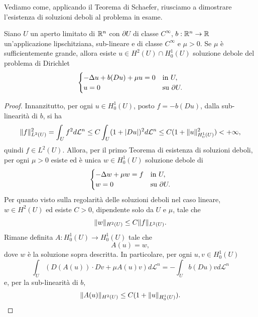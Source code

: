 Vediamo come, applicando il Teorema di Schaefer, riusciamo a dimostrare l'esistenza di soluzioni deboli al problema in esame.
\begin{teorema}
	Siano $U$ un aperto limitato di $\mathbb{R}^n$ con $\partial U$ di classe $C^\infty$, $b: \mathbb{R}^n \to \mathbb{R}$ un'applicazione lipschitziana, sub-lineare e di classe $C^\infty$ e $\mu >0$. Se $\mu$ è sufficientemente grande, allora esiste $u \in H^2(U)\cap H^1_0(U)$ soluzione debole
	del problema di Dirichlet
	\[ 	\begin{cases}
		-\Delta u + b(Du) + \mu u = 0 & \textup{in } U,\\
		u = 0 & \textup{su } \partial U.
	\end{cases} \] 
\end{teorema}
\begin{proof}
	Innanzitutto, per ogni $u \in H^1_0(U)$, posto $f = -b(Du)$, dalla sub-linearità di $b$, si ha
	\[ \lVert f\rVert_{L^2(U)}^2 = \int_U f^2 d\mathcal{L}^n\le C\int_U(1+\lvert Du\rvert)^2 d\mathcal{L}^n \le C(1+ \lVert u\rVert_{H^1_0(U)}^2)<+\infty, \]
	quindi $f \in L^2(U)$. Allora, per il primo Teorema di esistenza di soluzioni deboli, per ogni $\mu >0$ esiste ed è unica $w \in H^1_0(U)$ soluzione debole di 
	\[ \begin{cases}
		-\Delta w + \mu w = f & \textup{in } U,\\
		w=0 & \textup{su } \partial U.
	\end{cases} \]
	Per quanto visto sulla regolarità delle soluzioni deboli nel caso lineare, $w \in H^2(U)$ ed esiste $C>0$, dipendente solo da $U$ e $\mu$, tale che
	\[ \lVert w\rVert_{H^2(U)} \le C \lVert f\rVert_{L^2(U)}. \]
	Rimane definita $A: H^1_0(U) \to H^1_0(U)$ tale che
	\[ A(u) = w, \]
	dove $w$ è la soluzione sopra descritta. In particolare, per ogni $u,v \in H^1_0(U)$
	\begin{equation}\label{perilgranfinale}
		\int_U \left( D(A(u))\cdot Dv + \mu A(u)v\right) d\mathcal{L}^n = -\int_U b(Du)vd\mathcal{L}^n
	\end{equation}
	e, per la sub-linearità di $b$,
	\[ \lVert A(u)\rVert_{H^2(U)} \le C (1+ \lVert u\rVert_{H^1_0(U)}). \]
	

\end{proof}
